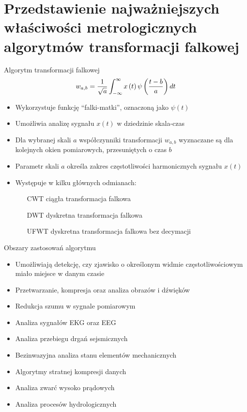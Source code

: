 \documentclass[12pt, polish, aspectratio = 169]{beamer}
\begin{document}
\section{Przedstawienie najważniejszych właściwości metrologicznych algorytmów transformacji falkowej}

\begin{frame}{Algorytm transformacji falkowej}
\begin{equation}
w_{a,b} = \frac{1}{\sqrt{a}} \int _{-\infty} ^{\infty} x \left(t\right) \psi \left(\frac{t-b}{a}\right) dt \label{eq:cwt}
\end{equation}
\begin{itemize}
\item Wykorzystuje funkcję \enquote{falki-matki}, oznaczoną jako $\psi(t)$
\item Umożliwia analizę sygnału $x(t)$ w dziedzinie skala-czas
\item Dla wybranej skali $a$ współczynniki transformacji $w_{a,b}$ wyznaczane są dla kolejnych okien pomiarowych, przesuniętych o czas $b$
\item Parametr skali $a$ określa zakres częstotliwości harmonicznych sygnału $x(t)$
\item Występuje w kilku głównych odmianach:
	\begin{itemize}
	\item[CWT] ciągła transformacja falkowa
	\item[DWT] dyskretna transformacja falkowa
	\item[UFWT] dyskretna transformacja falkowa bez decymacji
	\end{itemize}
\end{itemize}
\end{frame}

\begin{frame}{Obszary zastosowań algorytmu}
\begin{itemize}
\item Umożliwiają detekcję, czy zjawisko o określonym widmie częstotliwościowym miało miejsce w danym czasie
\end{itemize}
\begin{itemize}
\item Przetwarzanie, kompresja oraz analiza obrazów i dźwięków
\item Redukcja szumu w sygnale pomiarowym
\item Analiza sygnałów EKG oraz EEG
\item Analiza przebiegu drgań sejsmicznych
\item Bezinwazyjna analiza stanu elementów mechanicznych
\item Algorytmy stratnej kompresji danych
\item Analiza zwarć wysoko prądowych
\item Analiza procesów hydrologicznych
\end{itemize}
\end{frame}
\end{document}

